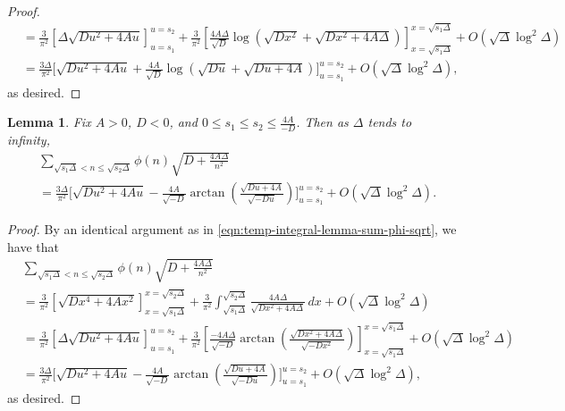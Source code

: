 \documentclass[11pt,letterpaper,reqno]{amsart}
\newtheorem{lemma}[theorem]{Lemma}
\numberwithin{equation}{section}
\numberwithin{figure}{section}
\numberwithin{table}{section}
\newcommand{\lrp}[1]{\left(#1\right)}
\newcommand{\lrb}[1]{\left[#1\right]}
\begin{document}
\begin{proof}
\begin{align}
        &= \frac{3}{\pi^2}\lrb{\Delta \sqrt{Du^2+4Au}}_{u=s_1}^{u=s_2} 
         + \frac{3}{\pi^2 } \lrb{\frac{4A\Delta}{\sqrt{D}} 
         \log\!\lrp{
                \sqrt{Dx^2} + \sqrt{Dx^2+4A\Delta}
            }
         }_{x=\sqrt{s_1 \Delta}}^{x=\sqrt{s_1 \Delta}} + O\!\lrp{\sqrt{\Delta} \log^2 \Delta} \\
         &= \frac{3\Delta}{\pi^2}\Bigg[  \sqrt{Du^2+4Au} +  \frac{4A}{\sqrt D}
            \log\!\lrp{
                \sqrt{Du} + \sqrt{Du+4A}
            }
         \Bigg]_{u=s_1}^{u=s_2} + O\!\lrp{\sqrt{\Delta} \log^2 \Delta},
    \end{align}
    as desired.
\end{proof}






\begin{lemma}
    \label{lem:sum-phi-sqrt-neg-discr}
    Fix $A > 0$, $D < 0$, and $0 \le s_1 \le s_2 \le \frac{4A}{-D}$. Then as $\Delta$ tends to infinity,
    \begin{align}
        &\sum_{ \sqrt{s_1 \Delta} < n \le \sqrt{s_2 \Delta} }
        \phi(n)  
        \sqrt{D+\frac{4A\Delta}{n^2}} \\
        &= \frac{3\Delta}{\pi^2}\Bigg[  \sqrt{Du^2+4Au} -  \frac{4A}{\sqrt{-D}}
            \arctan\!\lrp{\frac{\sqrt{Du+4A}}{\sqrt{-Du}}}
         \Bigg]_{u=s_1}^{u=s_2} + O\!\lrp{\sqrt{\Delta} \log^2 \Delta}.
    \end{align}
\end{lemma}
\begin{proof}  
    By an identical argument as in \eqref{eqn:temp-integral-lemma-sum-phi-sqrt}, we have that
    \begin{align}
        &\sum_{\sqrt{s_1 \Delta} < n \le \sqrt{s_2 \Delta}} \phi(n)\sqrt{D+\frac{4A\Delta}{n^2}} \\
        &= \frac{3}{\pi^2}\lrb{\sqrt{Dx^4+4Ax^2}}_{x=\sqrt{s_1\Delta}}^{x=\sqrt{s_2\Delta}}  
         + \frac{3}{\pi^2} \int_{\sqrt{s_1 \Delta}}^{\sqrt{s_2 \Delta}}   \frac{4A\Delta}{\sqrt{Dx^2+4A\Delta}} \,dx + O\!\lrp{\sqrt{\Delta} \log^2 \Delta} \\
        &= \frac{3}{\pi^2}\lrb{\Delta \sqrt{Du^2+4Au}}_{u=s_1}^{u=s_2} 
         + \frac{3}{\pi^2 } \lrb{\frac{-4A\Delta}{\sqrt{-D}} 
         \arctan\!\lrp{
            \frac{\sqrt{Dx^2+4A\Delta}}{\sqrt{-Dx^2}}
         }
         }_{x=\sqrt{s_1 \Delta}}^{x=\sqrt{s_1 \Delta}} + O\!\lrp{\sqrt{\Delta} \log^2 \Delta} \\
         &= \frac{3\Delta}{\pi^2}\Bigg[  \sqrt{Du^2+4Au} -  \frac{4A}{\sqrt{-D}}
            \arctan\!\lrp{
                \frac{\sqrt{Du+4A}}{\sqrt{-Du}}
             }
         \Bigg]_{u=s_1}^{u=s_2} + O\!\lrp{\sqrt{\Delta} \log^2 \Delta},
    \end{align}
    as desired.
\end{proof}
\end{document}

